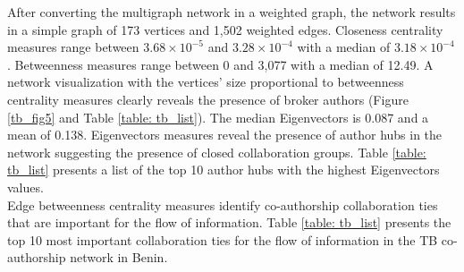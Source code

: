 After converting the multigraph network in a weighted graph, the network results in a simple graph of 173 vertices and 1,502 weighted edges. Closeness centrality measures range between $3.68\times 10^{-5}$ and $3.28\times 10^{-4}$ with a median of $3.18\times 10^{-4}$. Betweenness measures range between 0 and 3,077 with a median of 12.49. A network visualization with the vertices' size proportional to betweenness centrality measures clearly reveals the presence of broker authors (Figure \ref{tb_fig5} and Table \ref{table: tb_list}). The median Eigenvectors is 0.087 and a mean of 0.138. Eigenvectors measures reveal the presence of author hubs in the network suggesting the presence of closed collaboration groups. Table \ref{table: tb_list} presents a list of the top 10 author hubs with the highest Eigenvectors values.\\
Edge betweenness centrality measures identify co-authorship collaboration ties that are important for the flow of information. Table \ref{table: tb_list} presents the top 10 most important collaboration ties for the flow of information in the TB co-authorship network in Benin. %

